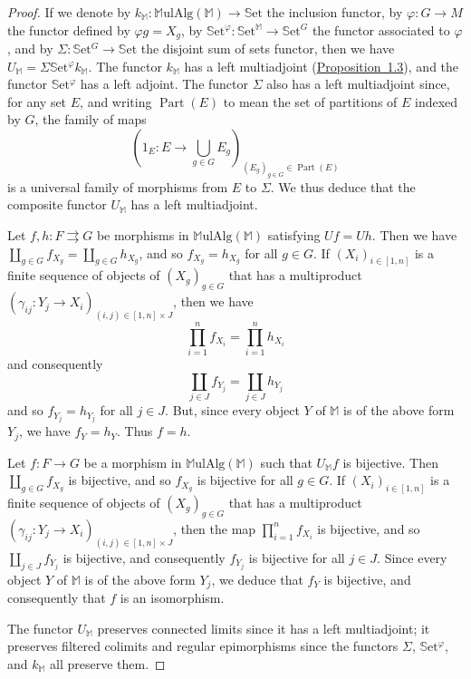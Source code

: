 \documentclass{article}
\newcommand{\bb}[1]{{\mathbb{#1}}}
\newcommand{\Set}{\mathbb{S}\mathrm{et}}
\newcommand{\MulAlg}{\mathbb{M}\mathrm{ulAlg}}
\DeclareMathOperator{\Part}{Part}
\newcommand{\oldpage}[1]{\marginpar{\footnotesize$\Big\vert$ \textit{p.~#1}}}
\begin{document}
\begin{proof}
  If we denote by $k_\bb{M}\colon\MulAlg(\bb{M})\to\Set$ the inclusion functor, by $\varphi\colon G\to M$ the functor defined by $\varphi g=X_g$, by $\Set^\varphi\colon\Set^\bb{M}\to\Set^G$ the functor associated to $\varphi$, and by $\Sigma\colon\Set^G\to\Set$ the disjoint sum of sets functor, then we have $U_\bb{M}=\Sigma\Set^\varphi k_\bb{M}$.
  The functor $k_\bb{M}$ has a left multiadjoint (\hyperref[1.3]{Proposition~1.3}), and the functor $\Set^\varphi$ has a left adjoint.
  The functor $\Sigma$ also has a left multiadjoint since, for any set $E$, and writing $\Part(E)$ to mean the set of partitions of $E$ indexed by $G$, the family of maps
  \[
    \left(1_E\colon E\to\bigcup_{g\in G}E_g\right)_{(E_g)_{g\in G}\in\Part(E)}
  \]
  is a universal family of morphisms from $E$ to $\Sigma$.
  We thus deduce that the composite functor $U_\bb{M}$ has a left multiadjoint.

  Let $f,h\colon F\rightrightarrows G$ be morphisms in $\MulAlg(\bb{M})$ satisfying $Uf=Uh$.
  Then we have $\coprod_{g\in G}f_{X_g}=\coprod_{g\in G}h_{X_g}$, and so $f_{X_g}=h_{X_g}$ for all $g\in G$.
  If $(X_i)_{i\in[1,n]}$ is a finite sequence of objects of $(X_g)_{g\in G}$ that has a multiproduct $(\gamma_{ij}\colon Y_j\to X_i)_{(i,j)\in[1,n]\times J}$, then we have
  \[
    \prod_{i=1}^n f_{X_i} = \prod_{i=1}^n h_{X_i}
  \]
  and consequently
  \[
    \coprod_{j\in J} f_{Y_j} = \coprod_{j\in J} h_{Y_j}
  \]
  and so $f_{Y_j}=h_{Y_j}$ for all $j\in J$.
  But, since every object $Y$ of $\bb{M}$ is of the above form $Y_j$, we have $f_Y=h_Y$.
  Thus $f=h$.

\oldpage{200}
  Let $f\colon F\to G$ be a morphism in $\MulAlg(\bb{M})$ such that $U_\bb{M}f$ is bijective.
  Then $\coprod_{g\in G}f_{X_g}$ is bijective, and so $f_{X_g}$ is bijective for all $g\in G$.
  If $(X_i)_{i\in[1,n]}$ is a finite sequence of objects of $(X_g)_{g\in G}$ that has a multiproduct $(\gamma_{ij}\colon Y_j\to X_i)_{(i,j)\in[1,n]\times J}$, then the map $\prod_{i=1}^nf_{X_i}$ is bijective, and so $\coprod_{j\in J}f_{Y_j}$ is bijective, and consequently $f_{Y_j}$ is bijective for all $j\in J$.
  Since every object $Y$ of $\bb{M}$ is of the above form $Y_j$, we deduce that $f_Y$ is bijective, and consequently that $f$ is an isomorphism.

  The functor $U_\bb{M}$ preserves connected limits since it has a left multiadjoint; it preserves filtered colimits and regular epimorphisms since the functors $\Sigma$, $\Set^\varphi$, and $k_\bb{M}$ all preserve them.
\end{proof}
\end{document}
